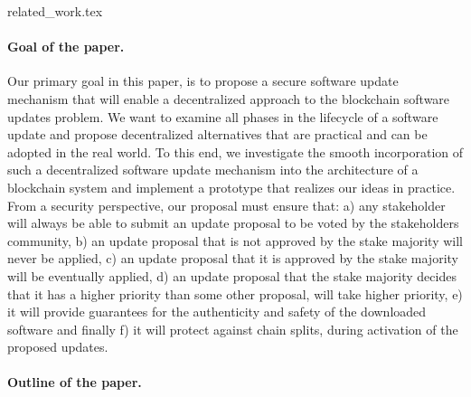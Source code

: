 {related_work.tex}

\paragraph{Goal of the paper.}
Our primary goal in this paper, is to propose a secure software update mechanism that will enable a decentralized approach to the blockchain software updates problem. We want to examine all phases in the lifecycle of a software update and propose decentralized alternatives that are practical and can be adopted in the real world. To this end, we investigate the smooth incorporation of such a decentralized software update mechanism into the architecture of a blockchain system and implement a prototype that realizes our ideas in practice. From a security perspective, our proposal must ensure that:
a) any stakeholder will always be able to submit an update proposal to be voted by the stakeholders community, b) an update proposal that is not approved by the stake majority will never be applied, c) an update proposal that it is approved by the stake majority will be eventually applied, d) an update proposal that the stake majority decides that it has a higher priority than some other proposal, will take higher priority, e) it will provide guarantees for the authenticity and safety of the downloaded software and finally f) it will protect against chain splits, during activation of the proposed updates.

\paragraph{Outline of the paper.}
